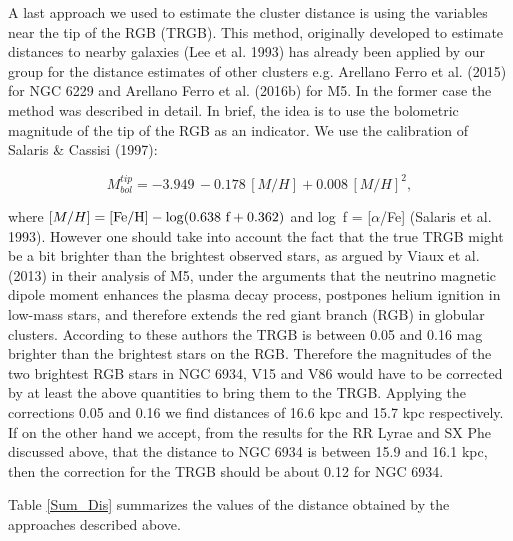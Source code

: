 \documentclass[journal]{rmaa}
\newcommand{\1}{\'{\i}}
\begin{document}
A last approach we used to estimate the cluster distance is using the variables
near the tip of the RGB (TRGB).
This method, originally developed to estimate distances to nearby galaxies (Lee et
al. 1993) has already
been applied by our group for the distance estimates of other clusters e.g. Arellano
Ferro et al. (2015) for
NGC 6229 and Arellano Ferro et al. (2016b) for M5. In the former case the method
was described in detail.  In brief, the idea is to use the bolometric magnitude
of the tip of the RGB as an indicator. We use the calibration of Salaris \& Cassisi
(1997):

\begin{equation}
\label{TRGB}
M_{bol}^{tip} = -3.949\, -0.178\, [M/H] + 0.008\, [M/H]^2,
\end{equation}

\noindent
where $[M/H] = \rm{[Fe/H]} - \rm {log} (0.638~f + 0.362)$ and log~f = [$\alpha$/Fe]
(Salaris et al. 1993). However one should take into account the fact that the true
TRGB might
be a bit brighter than the brightest observed stars, as argued by Viaux et al. (2013)
in their analysis of M5, under the arguments that the neutrino magnetic dipole moment
enhances the plasma decay process, postpones helium ignition in low-mass stars, and
therefore extends the red giant branch (RGB) in globular clusters. According to these
authors the TRGB is between 0.05 and 0.16 mag brighter than the brightest stars on the
RGB. Therefore the
magnitudes of the two brightest RGB stars in NGC 6934, V15 and V86
would have to be corrected by at least the above quantities to bring them to the TRGB.
Applying the corrections 0.05 and 0.16 we find distances of 16.6 kpc and
15.7 kpc respectively. If on the other hand we accept, from the results for the RR
Lyrae and SX Phe discussed above, that the distance to NGC 6934 is between 15.9 and
16.1 kpc, then the correction for the TRGB should be about 0.12 for NGC 6934.

Table \ref{Sum_Dis} summarizes the values of the distance obtained by the
approaches described above.
\end{document}
